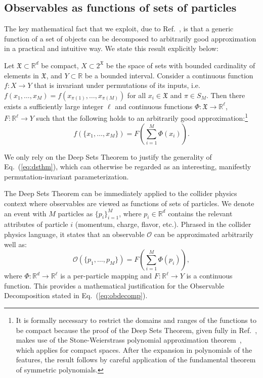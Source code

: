 \documentclass[letterpaper,11pt]{article}
\DeclareRobustCommand{\Eq}[1]{Eq.~(\ref{#1})}
\DeclareRobustCommand{\Ref}[1]{Ref.~\cite{#1}}
\newtheorem*{dsthm}{Deep Sets Theorem~\cite{\deepsets}}
\newcommand{\deepsets}{DBLP:conf/nips/ZaheerKRPSS17}
\begin{document}
\subsection{Observables as functions of sets of particles}
\label{sec:funcofsets}


The key mathematical fact that we exploit, due to \Ref{DBLP:conf/nips/ZaheerKRPSS17}, is that a generic function of a set of objects can be decomposed to arbitrarily good approximation in a practical and intuitive way.
%
We state this result explicitly below:
\begin{dsthm}
\label{thm:ds}
Let $\mathfrak X\subset \mathbb{R}^d$ be compact, $X\subset 2^{\mathfrak X}$ be the space of sets with bounded cardinality of elements in $\mathfrak X$, and $Y\subset\mathbb{R}$ be a bounded interval.
%
Consider a continuous function $f:X\to Y$ that is invariant under permutations of its inputs, i.e.\ $f(x_1,\ldots,x_M)=f(x_{\pi(1)},\ldots,x_{\pi(M)})$ for all $x_i\in\mathfrak X$ and $\pi\in S_M$.
%
Then there exists a sufficiently large integer $\ell$ and continuous functions $\Phi:\mathfrak X\to \mathbb{R}^\ell$, $F:\mathbb{R}^\ell\to Y$ such that the following holds to an arbitrarily good approximation:\footnote{It is formally necessary to restrict the domains and ranges of the functions to be compact because the proof of the Deep Sets Theorem, given fully in \Ref{DBLP:conf/nips/ZaheerKRPSS17}, makes use of the Stone-Weierstrass polynomial approximation theorem~\cite{Stone:1948gen}, which applies for compact spaces. After the expansion in polynomials of the features, the result follows by careful application of the fundamental theorem of symmetric polynomials.}
\begin{equation}\label{eq:dsthm}
f(\{x_1,\ldots,x_M\}) = F\left(\sum_{i=1}^M \Phi(x_i)\right).
\end{equation}
\end{dsthm}
%
\noindent We only rely on the Deep Sets Theorem to justify the generality of \Eq{eq:dsthm}, which can otherwise be regarded as an interesting, manifestly permutation-invariant parameterization.


The Deep Sets Theorem can be immediately applied to the collider physics context where observables are viewed as functions of sets of particles.
%
We denote an event with $M$ particles as $\{p_i\}_{i=1}^M$, where $p_i\in \mathbb{R}^d$ contains the relevant attributes of particle $i$ (momentum, charge, flavor, etc.).
%
Phrased in the collider physics language, it states that an observable $\mathcal O$ can be approximated arbitrarily well as:
\begin{equation}
\label{eq:obdecomp2}
\mathcal O(\{p_1,\ldots,p_M\}) = F\left(\sum_{i=1}^M \Phi (p_i)\right),
\end{equation}
where $\Phi: \mathbb R^d\to \mathbb R^\ell$ is a per-particle mapping and $F:\mathbb R^\ell\to Y$ is a continuous function.
%
This provides a mathematical justification for the Observable Decomposition stated in \Eq{eq:obdecomp}.
\end{document}
